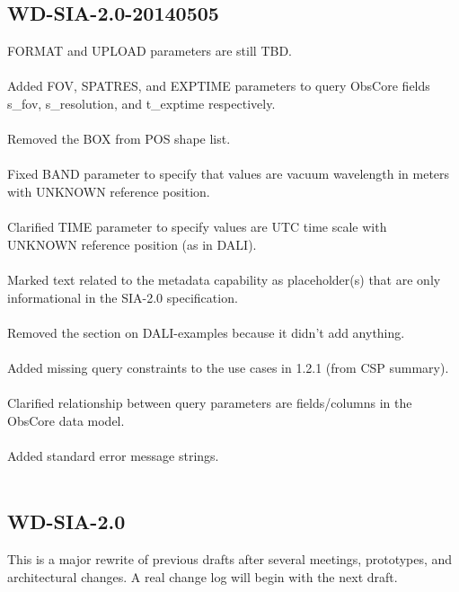\documentclass[11pt,a4paper]{ivoa}
\begin{document}
\subsection{WD-SIA-2.0-20140505}
FORMAT and UPLOAD parameters are still TBD. \\ \\
Added FOV, SPATRES, and EXPTIME parameters to query ObsCore fields s\_fov, s\_resolution, and t\_exptime respectively. \\ \\
Removed the BOX from POS shape list. \\ \\
Fixed BAND parameter to specify that values are vacuum wavelength in meters with UNKNOWN reference position. \\ \\
Clarified TIME parameter to specify values are UTC time scale with UNKNOWN reference position (as in DALI). \\ \\
Marked text related to the {metadata} capability as placeholder(s) that are only informational in the SIA-2.0 specification. \\ \\
Removed the section on DALI-examples because it didn't add anything. \\ \\
Added missing query constraints to the use cases in 1.2.1 (from CSP summary). \\ \\
Clarified relationship between query parameters are fields/columns in the ObsCore data model. \\ \\
Added standard error message strings. \\ \\
\subsection{WD-SIA-2.0}
This is a major rewrite of previous drafts after several meetings, prototypes, and architectural changes. A real change log will begin with the next draft.



\end{document}
